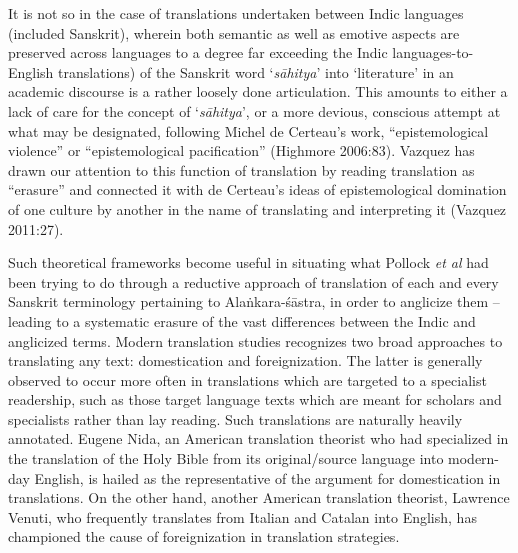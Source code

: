It is not so in the case of translations undertaken between Indic languages (included Sanskrit), wherein both semantic as well as emotive aspects are preserved across languages to a degree far exceeding the Indic languages-to-English translations) of the Sanskrit word ‘\textsl{sāhitya}’ into ‘literature’ in an academic discourse is a rather loosely done articulation. This amounts to either a lack of care for the concept of ‘\textsl{sāhitya}’, or a more devious, conscious attempt at what may be designated, following Michel de Certeau’s work, “epistemological violence” or “epistemological pacification” (Highmore 2006:83). Vazquez has drawn our attention to this function of translation by reading translation as “erasure” and connected it with de Certeau’s ideas of epistemological domination of one culture by another in the name of translating and interpreting it (Vazquez 2011:27). 

Such theoretical frameworks become useful in situating what Pollock \textsl{et al} had been trying to do through a reductive approach of translation of each and every Sanskrit terminology pertaining to Alaṅkara-śāstra, in order to anglicize them -- leading to a systematic erasure of the vast differences between the Indic and anglicized terms. Modern translation studies recognizes two broad approaches to translating any text: domestication and foreignization. The latter is generally observed to occur more often in translations which are targeted to a specialist readership, such as those target language texts which are meant for scholars and specialists rather than lay reading. Such translations are naturally heavily annotated. Eugene Nida, an American translation theorist who had specialized in the translation of the Holy Bible from its original/source language into modern-day English, is hailed as the representative of the argument for domestication in translations. On the other hand, another American translation theorist, Lawrence Venuti, who frequently translates from Italian and Catalan into English, has championed the cause of foreignization in translation strategies. 

